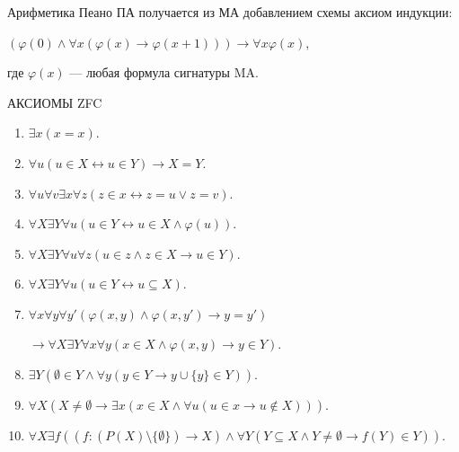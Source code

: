 \documentclass[a4paper,11pt]{article}
\begin{document}
Арифметика Пеано ПА получается из МА добавлением схемы аксиом индукции:
\medskip

$(\varphi(0) \wedge \forall
x(\varphi(x) \rightarrow \varphi(x + 1))) \rightarrow \forall x
\varphi(x)$,
\medskip

 где $\varphi(x)$ --- любая формула сигнатуры MA.
 



АКСИОМЫ ZFC
\medskip

\begin{enumerate}
\item $\exists x(x=x)$.

\item $\forall u(u\in X\leftrightarrow u\in Y)\to X=Y$.

\item $\forall u\forall v\exists x\forall z(z\in x\leftrightarrow z=u\lor z=v)$.

\item $\forall X\exists Y\forall u(u\in Y\leftrightarrow u\in X\land\varphi(u))$.

\item $\forall X\exists Y\forall u\forall z(u\in z\land z\in X\to u\in Y)$.

\item $\forall X\exists Y\forall u(u\in Y\leftrightarrow u\subseteq X)$.
\medskip

\item $\forall x\forall y\forall y'(\varphi(x,y)\land\varphi(x,y')\to y=y')$

$\to\forall X\exists Y\forall x\forall y(x\in X\land\varphi(x,y)\to y\in Y)$.
\medskip

\item $\exists Y(\emptyset\in Y\land\forall y(y\in Y\to y\cup\{y\}\in Y))$.
\medskip

\item $\forall X(X\not=\emptyset\to\exists x(x\in X\land\forall u(u\in x\to u\not\in X)))$.
\medskip

\item $\forall X\exists f((f:(P(X)\setminus\{\emptyset\})\to X)\land\forall Y(Y\subseteq X\land Y\not=\emptyset\to f(Y)\in Y))$.
\end{enumerate}
\end{document}
